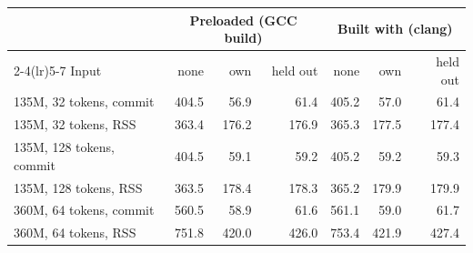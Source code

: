 \begin{tabular}{lrrrrrr}
\toprule
 & \multicolumn{3}{c}{Preloaded (GCC build)} & \multicolumn{3}{c}{Built with \pass{} (clang)} \\
\cmidrule(lr){2-4}\cmidrule(lr){5-7}
Input & none & own & held out & none & own & held out \\
\midrule
135M, 32 tokens, commit & 404.5 & 56.9 & 61.4 & 405.2 & 57.0 & 61.4 \\
135M, 32 tokens, RSS & 363.4 & 176.2 & 176.9 & 365.3 & 177.5 & 177.4 \\
135M, 128 tokens, commit & 404.5 & 59.1 & 59.2 & 405.2 & 59.2 & 59.3 \\
135M, 128 tokens, RSS & 363.5 & 178.4 & 178.3 & 365.2 & 179.9 & 179.9 \\
360M, 64 tokens, commit & 560.5 & 58.9 & 61.6 & 561.1 & 59.0 & 61.7 \\
360M, 64 tokens, RSS & 751.8 & 420.0 & 426.0 & 753.4 & 421.9 & 427.4 \\
\bottomrule
\end{tabular}
